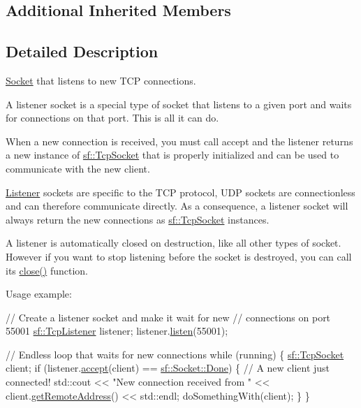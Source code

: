 \subsection*{Additional Inherited Members}


\subsection{Detailed Description}
\hyperlink{classsf_1_1_socket}{Socket} that listens to new T\+CP connections. 

A listener socket is a special type of socket that listens to a given port and waits for connections on that port. This is all it can do.

When a new connection is received, you must call accept and the listener returns a new instance of \hyperlink{classsf_1_1_tcp_socket}{sf\+::\+Tcp\+Socket} that is properly initialized and can be used to communicate with the new client.

\hyperlink{classsf_1_1_listener}{Listener} sockets are specific to the T\+CP protocol, U\+DP sockets are connectionless and can therefore communicate directly. As a consequence, a listener socket will always return the new connections as \hyperlink{classsf_1_1_tcp_socket}{sf\+::\+Tcp\+Socket} instances.

A listener is automatically closed on destruction, like all other types of socket. However if you want to stop listening before the socket is destroyed, you can call its \hyperlink{classsf_1_1_tcp_listener_a3a00a850506bd0f9f48867a0fe59556b}{close()} function.

Usage example\+: 
\begin{DoxyCode}
\textcolor{comment}{// Create a listener socket and make it wait for new}
\textcolor{comment}{// connections on port 55001}
\hyperlink{classsf_1_1_tcp_listener}{sf::TcpListener} listener;
listener.\hyperlink{classsf_1_1_tcp_listener_a9504758ea3570e62cb20b209c11776a1}{listen}(55001);

\textcolor{comment}{// Endless loop that waits for new connections}
\textcolor{keywordflow}{while} (running)
\{
    \hyperlink{classsf_1_1_tcp_socket}{sf::TcpSocket} client;
    \textcolor{keywordflow}{if} (listener.\hyperlink{classsf_1_1_tcp_listener_ae2c83ce5a64d50b68180c46bef0a7346}{accept}(client) == \hyperlink{classsf_1_1_socket_a51bf0fd51057b98a10fbb866246176dca1de3a85bc56d3ae85b3d0f3cfd04ae90}{sf::Socket::Done})
    \{
        \textcolor{comment}{// A new client just connected!}
        std::cout << \textcolor{stringliteral}{"New connection received from "} << client.\hyperlink{classsf_1_1_tcp_socket_aa8579c203b1fd21beb74d7f76444a94c}{getRemoteAddress}() << 
      std::endl;
        doSomethingWith(client);
    \}
\}
\end{DoxyCode}


